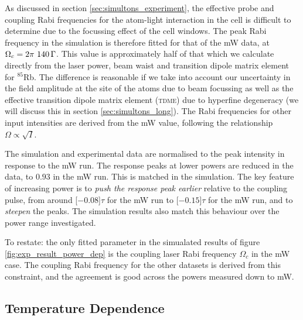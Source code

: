    As discussed in section \ref{sec:simultons_experiment}, the effective probe
    and coupling Rabi frequencies for the atom-light interaction in the cell is
    difficult to determine due to the focussing effect of the cell windows. The
    peak Rabi frequency in the simulation is therefore fitted for that of the
    \unit[100]{mW} data, at $\Omega_c = \unit[2\pi~140]{\Gamma}$.  This value is
    approximately half of that which we calculate directly from the laser power,
    beam waist and transition dipole matrix element for $^{85}$Rb. The
    difference is reasonable if we take into account our uncertainty in the
    field amplitude at the site of the atoms due to beam focussing as well as
    the effective transition dipole matrix element (\textsc{tdme}) due to
    hyperfine degeneracy (we will discuss this in section
    \ref{sec:simultons_long}). The Rabi frequencies for other input intensities
    are derived from the \unit[100]{mW} value, following the relationship
    $\Omega \propto \sqrt{I}$.

    The simulation and experimental data are normalised to the peak intensity in
    response to the \unit[100]{mW} run. The response peaks at lower powers are
    reduced in the data, to $0.93$ in the \unit[20]{mW} run. This is matched in
    the simulation. The key feature of increasing power is to \textit{push the
    response peak earlier} relative to the coupling pulse, from around
    \unit[$-0.08$]{$\tau$} for the \unit[20]{mW} run to \unit[$-0.15$]{$\tau$}
    for the \unit[100]{mW} run, and to \textit{steepen} the peaks. The
    simulation results also match this behaviour over the power range
    investigated.

     To restate: the only fitted parameter in the simualated results of figure
     \ref{fig:exp_result_power_dep} is the coupling laser Rabi frequency
     $\Omega_c$ in the \unit[100]{mW} case. The coupling Rabi frequency for the
     other datasets is derived from this constraint, and the agreement is good
     across the powers measured down to \unit[20]{mW}.

  \subsection{Temperature Dependence}

